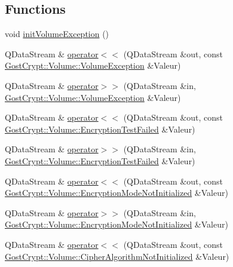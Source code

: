 \subsection*{Functions}
\begin{DoxyCompactItemize}
\item 
void \hyperlink{namespace_gost_crypt_1_1_volume_a3023752494e086cccb82f5074d7c6e4c}{init\+Volume\+Exception} ()
\item 
Q\+Data\+Stream \& \hyperlink{namespace_gost_crypt_1_1_volume_aef96897fc1bff67356931452f10836ee}{operator$<$$<$} (Q\+Data\+Stream \&out, const \hyperlink{class_gost_crypt_1_1_volume_1_1_volume_exception}{Gost\+Crypt\+::\+Volume\+::\+Volume\+Exception} \&Valeur)
\item 
Q\+Data\+Stream \& \hyperlink{namespace_gost_crypt_1_1_volume_a6979dbb58485267dc0ad9d26c2f515f0}{operator$>$$>$} (Q\+Data\+Stream \&in, \hyperlink{class_gost_crypt_1_1_volume_1_1_volume_exception}{Gost\+Crypt\+::\+Volume\+::\+Volume\+Exception} \&Valeur)
\item 
Q\+Data\+Stream \& \hyperlink{namespace_gost_crypt_1_1_volume_a912aa6924eaa4043d75757d916f327b4}{operator$<$$<$} (Q\+Data\+Stream \&out, const \hyperlink{class_gost_crypt_1_1_volume_1_1_encryption_test_failed}{Gost\+Crypt\+::\+Volume\+::\+Encryption\+Test\+Failed} \&Valeur)
\item 
Q\+Data\+Stream \& \hyperlink{namespace_gost_crypt_1_1_volume_a0a4c69e94b20f187bcfa3cc5f38accba}{operator$>$$>$} (Q\+Data\+Stream \&in, \hyperlink{class_gost_crypt_1_1_volume_1_1_encryption_test_failed}{Gost\+Crypt\+::\+Volume\+::\+Encryption\+Test\+Failed} \&Valeur)
\item 
Q\+Data\+Stream \& \hyperlink{namespace_gost_crypt_1_1_volume_aa3ad7a1a13e855f42d810444945486f5}{operator$<$$<$} (Q\+Data\+Stream \&out, const \hyperlink{class_gost_crypt_1_1_volume_1_1_encryption_mode_not_initialized}{Gost\+Crypt\+::\+Volume\+::\+Encryption\+Mode\+Not\+Initialized} \&Valeur)
\item 
Q\+Data\+Stream \& \hyperlink{namespace_gost_crypt_1_1_volume_abb0556434098d54619fcc0d100d7bc56}{operator$>$$>$} (Q\+Data\+Stream \&in, \hyperlink{class_gost_crypt_1_1_volume_1_1_encryption_mode_not_initialized}{Gost\+Crypt\+::\+Volume\+::\+Encryption\+Mode\+Not\+Initialized} \&Valeur)
\item 
Q\+Data\+Stream \& \hyperlink{namespace_gost_crypt_1_1_volume_a8f703126ba79f5d84c777400b5e5fac7}{operator$<$$<$} (Q\+Data\+Stream \&out, const \hyperlink{class_gost_crypt_1_1_volume_1_1_cipher_algorithm_not_initialized}{Gost\+Crypt\+::\+Volume\+::\+Cipher\+Algorithm\+Not\+Initialized} \&Valeur)

\end{DoxyCompactItemize}
